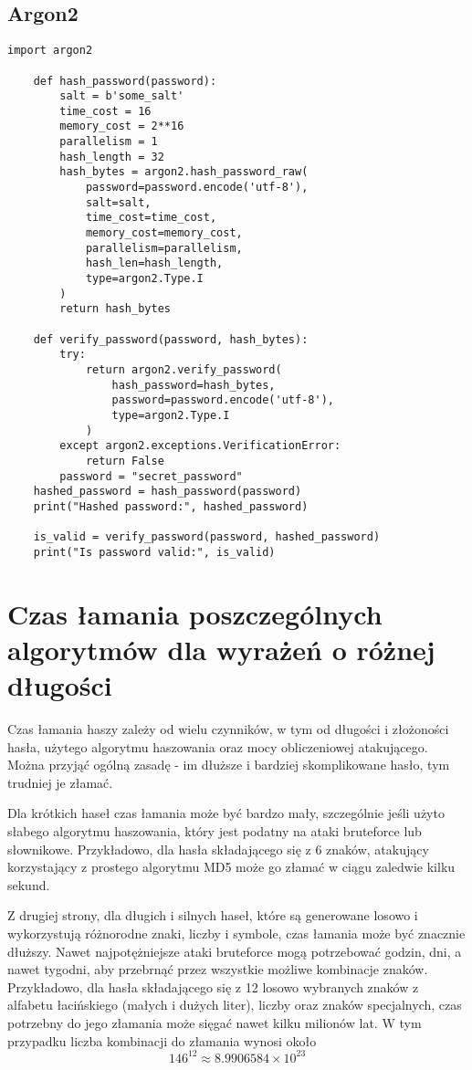 \documentclass{article}
\begin{document}
\subsection*{Argon2}
\begin{lstlisting}[style=pythonstyle]
    import argon2

    def hash_password(password):
        salt = b'some_salt'
        time_cost = 16
        memory_cost = 2**16 
        parallelism = 1      
        hash_length = 32
        hash_bytes = argon2.hash_password_raw(
            password=password.encode('utf-8'),
            salt=salt,
            time_cost=time_cost,
            memory_cost=memory_cost,
            parallelism=parallelism,
            hash_len=hash_length,
            type=argon2.Type.I 
        )
        return hash_bytes
    
    def verify_password(password, hash_bytes):
        try:
            return argon2.verify_password(
                hash_password=hash_bytes,
                password=password.encode('utf-8'),
                type=argon2.Type.I  
            )
        except argon2.exceptions.VerificationError:
            return False
        password = "secret_password"
    hashed_password = hash_password(password)
    print("Hashed password:", hashed_password)

    is_valid = verify_password(password, hashed_password)
    print("Is password valid:", is_valid)    
\end{lstlisting}


\section{Czas łamania poszczególnych algorytmów dla wyrażeń o różnej długości}
    Czas łamania haszy zależy od wielu czynników, w tym od długości i złożoności hasła, użytego algorytmu haszowania oraz mocy obliczeniowej atakującego. Można przyjąć ogólną zasadę - im dłuższe i bardziej skomplikowane hasło, tym trudniej je złamać. 

    Dla krótkich haseł czas łamania może być bardzo mały, szczególnie jeśli użyto słabego algorytmu haszowania, który jest podatny na ataki bruteforce lub słownikowe. Przykładowo, dla hasła składającego się z 6 znaków, atakujący korzystający z prostego algorytmu MD5 może go złamać w ciągu zaledwie kilku sekund.

    Z drugiej strony, dla długich i silnych haseł, które są generowane losowo i wykorzystują różnorodne znaki, liczby i symbole, czas łamania może być znacznie dłuższy. Nawet najpotężniejsze ataki bruteforce mogą potrzebować godzin, dni, a nawet tygodni, aby przebrnąć przez wszystkie możliwe kombinacje znaków. Przykładowo, dla hasła składającego się z 12 losowo wybranych znaków z alfabetu łacińskiego (małych i dużych liter), liczby oraz znaków specjalnych, czas potrzebny do jego złamania może sięgać nawet kilku milionów lat. W tym przypadku liczba kombinacji do złamania wynosi około \[146^{12} \approx 8.9906584 \times 10^{23}\]
\end{document}
